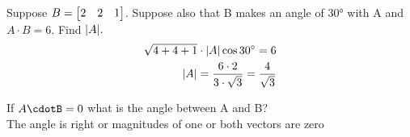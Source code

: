 \documentclass{article}
\begin{document}
    \begin{problem}
        Suppose $B=\bmqty{2 & 2 & 1}$. Suppose also that B makes an angle of $\ang{30}$ with A and $A\cdot B=6$. Find $\abs{A}.$\\
        \begin{align}
            \sqrt{4 + 4 +1}\cdot\abs{A}\cos{\ang{30}}=6\\
            \abs{A}=\frac{6\cdot2}{3\cdot\sqrt{3}}=\frac{4}{\sqrt{3}}
        \end{align}
    \end{problem}

    \begin{problem}
        If $A\cdotB=0$ what is the angle between A and B?\\
        The angle is right or magnitudes of one or both vectors are zero
    \end{problem}
\end{document}
